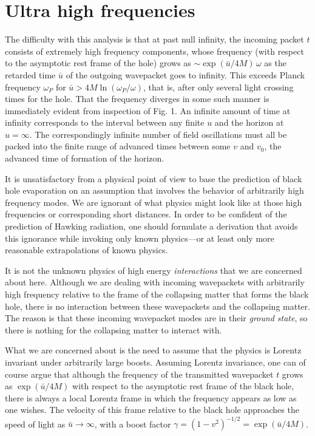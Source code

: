 \documentclass[12pt]{article}
\def\o{\omega}
\def\ubar{\bar{u}}
\begin{document}
\section{Ultra high frequencies}
\label{sec:3}

The difficulty with this analysis is that at past null infinity,
the incoming packet $t$ consists of extremely high frequency
components, whose frequency (with respect to the asymptotic rest
frame of the hole) grows as $\sim\exp(\ubar/4M)\, \o$ as the
retarded time $\ubar$ of the outgoing wavepacket goes to
infinity. This exceeds Planck frequency $\o_P$ for $\ubar>4M
\ln(\o_P/\o)$, that is, after only several light
crossing times for the hole. That the frequency diverges in
some such manner is immediately evident from inspection of
Fig. 1. An infinite amount of time at infinity corresponds
to the interval between any finite $u$ and the horizon at
$u=\infty$. The correspondingly infinite number of field
oscillations must all be packed into the finite range of
advanced times between some $v$ and $v_0$, the advanced time of
formation of the horizon.

It is unsatisfactory from a physical point of view to base
the prediction of black hole evaporation on an assumption
that involves the behavior of arbitrarily high frequency
modes. We are ignorant of what physics might look like at
those high frequencies or corresponding short distances.
In order to be confident of the prediction of Hawking
radiation, one should formulate a derivation that avoids
this ignorance while invoking only known physics---or at
least only more reasonable extrapolations of known physics.

It is not the unknown physics of high energy
{\it interactions} that we are concerned about here.
Although we are dealing with incoming
wavepackets with arbitrarily high frequency relative to
the frame of the collapsing matter that forms the black
hole, there is no interaction between these wavepackets
and the collapsing matter. The reason is that these incoming
wavepacket modes are in their {\it ground state}, so there
is nothing for the collapsing matter to interact with.

What we are concerned about is the need to assume that
the physics is Lorentz invariant under arbitrarily large boosts.
Assuming Lorentz invariance, one can of course argue
that although the frequency of the transmitted wavepacket $t$
grows as $\exp(\ubar/4M)$ with respect to the asymptotic rest frame
of the black hole, there is always a local Lorentz
frame in which the frequency appears as low as one wishes.
The velocity of this frame relative to the black hole
approaches the speed of light as $\ubar\rightarrow\infty$,
with a boost factor $\gamma=(1-v^2)^{-1/2}=\exp(\ubar/4M)$.
\end{document}
